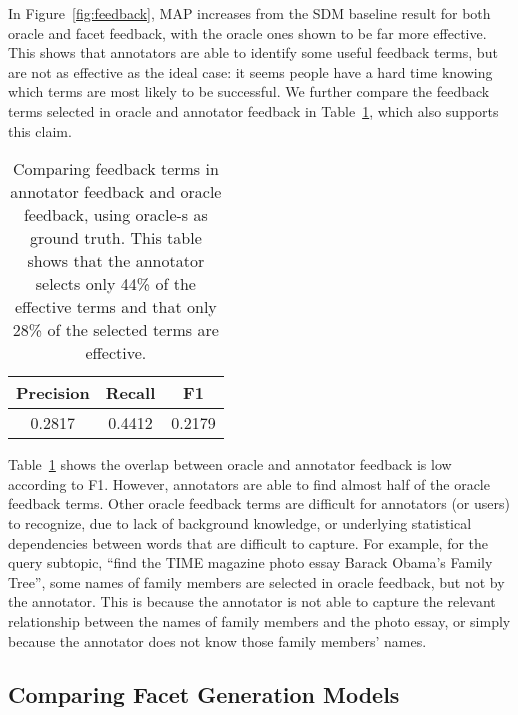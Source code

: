 In Figure~\ref{fig:feedback}, MAP increases from the SDM baseline result for both oracle and facet feedback, with the oracle ones shown to be far more effective. This shows that annotators are able to identify some useful feedback terms, but are not as effective as the ideal case: it seems people have a hard time knowing which terms are most likely to be successful. We further compare the feedback terms selected in oracle and annotator feedback in Table~\ref{tab:feedback}, which also supports this claim.

\begin{table}[H]
\centering
\caption{Comparing feedback terms in annotator feedback and oracle feedback, using oracle-s as ground truth. This table shows that the annotator selects only 44\% of the effective terms and that only 28\% of the selected terms are effective.}
\label{tab:feedback}
\begin{tabular}{|c|c|c|} \hline
Precision & Recall & F1\\  \hline
0.2817 & 0.4412 & 0.2179 \\ \hline
\end{tabular}
\end{table}

Table~\ref{tab:feedback} shows the overlap between oracle and annotator feedback is low according to F1. However, annotators are able to find almost half of the oracle feedback terms. Other oracle feedback terms are difficult for annotators (or users) to recognize, due to lack of background knowledge, or underlying statistical dependencies between words that are difficult to capture. For example, for the query subtopic, ``find the TIME magazine photo essay Barack Obama's Family Tree'', some names of family members are selected in oracle feedback, but not by the annotator. This is because the annotator is not able to capture the relevant relationship between the names of family members and the photo essay, or simply because the annotator does not know those family members' names.

\subsection{Comparing Facet Generation Models}
